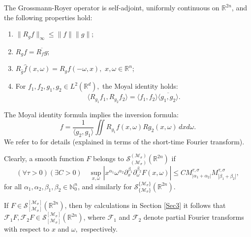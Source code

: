 \documentclass{article}
\theoremstyle{thmstyleone}
\theoremstyle{thmstyletwo}%
\theoremstyle{thmstylethree}%
\begin{document}

The Grossmann-Royer operator is self-adjoint, uniformly continuous on
$\mathbb{R}^{2n}$, and the following properties hold:
\begin{enumerate}
\item $ \| R_g f \|_\infty \leq \| f\| \|g\|$;
\item $  R_g f = \overline{R_f g}$;
\item $  R_{ \hat g} \hat f ( x, \omega) =  R_{ g} f (-\omega, x),$
$ x,\omega \in  \mathbb{R}^n$;
\item For $ f_1, f_2, g_1, g_2  \in L^2 (\mathbb{R}^d),$ the Moyal identity holds:
$$ \langle R_{g_1} f_1, R_{ g_2} f_2 \rangle = \langle f_1, f_2 \rangle \overline{\langle g_1, g_2 \rangle}. $$
\end{enumerate}

The Moyal identity formula implies the inversion formula:
\begin{equation} \label{eq:inversion}
f = \frac{1}{\langle g_2, g_1 \rangle} \iint  R_{g_1} f (x, \omega)
R g_2 (x,\omega) \, dx d\omega.
\end{equation}
We refer to \cite{Gro} for details (explained in terms of the short-time Fourier transform).



Clearly, a smooth function $ F $ belongs to
$ \mathcal S_{(\mathcal{M}_\sigma)}^{(\mathcal{M}_\sigma)} 
(\mathbb R^{2n}) $ if
\begin{equation} \label{eq:doubledimension}
 (\forall \tau>0) (\exists C>0)
 \quad
   \sup_{x, \omega}
   |x^{\alpha_1} \omega^{\alpha_2} 
   \partial_x ^{\beta_1}   \partial_\omega ^{\beta_2} 
   F(x, \omega)|
   \leq C
   M^{\tau,\sigma}_{|\alpha_1 + \alpha_2|}  
   M^{\tau,\sigma}_{|\beta_1 + \beta_2|},
\end{equation}
for all $
\alpha_1, \alpha_2,\beta_1, \beta_2 \in\mathbb N_0^n$,
and similarly for $ \mathcal S_{\{\mathcal{M}_\sigma \}}^{\{\mathcal{M}_\sigma\}} 
(\mathbb R^{2n}) $.

 If $ F \in  \mathcal S_{[\mathcal{M}_\sigma]}^{[\mathcal{M}_\sigma]}  (\mathbb R^{2n}) $, then by calculations in Section \ref{Sec3}  it follows that $\mathcal F_1 F, \mathcal F_2 F  \in  \mathcal S_{[\mathcal{M}_\sigma]}^{[\mathcal{M}_\sigma]}  (\mathbb R^{2n}) $, where  $\mathcal F_1 $ and  
  $\mathcal F_2 $ denote partial Fourier transforms with respect to $x$ and $\omega ,$ respectively.
\end{document}
